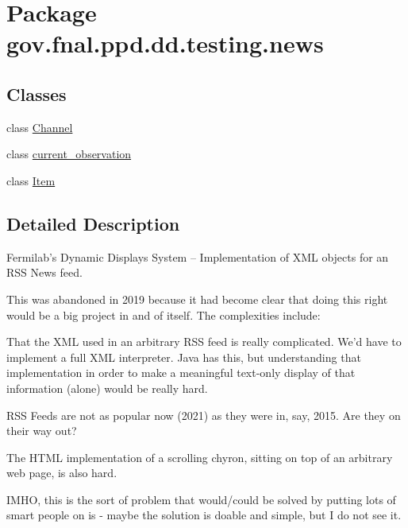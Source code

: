 \hypertarget{namespacegov_1_1fnal_1_1ppd_1_1dd_1_1testing_1_1news}{\section{Package gov.\-fnal.\-ppd.\-dd.\-testing.\-news}
\label{namespacegov_1_1fnal_1_1ppd_1_1dd_1_1testing_1_1news}
}
\subsection*{Classes}
\begin{DoxyCompactItemize}
\item 
class \hyperlink{classgov_1_1fnal_1_1ppd_1_1dd_1_1testing_1_1news_1_1Channel}{Channel}
\item 
class \hyperlink{classgov_1_1fnal_1_1ppd_1_1dd_1_1testing_1_1news_1_1current__observation}{current\-\_\-observation}
\item 
class \hyperlink{classgov_1_1fnal_1_1ppd_1_1dd_1_1testing_1_1news_1_1Item}{Item}
\end{DoxyCompactItemize}


\subsection{Detailed Description}
Fermilab's Dynamic Displays System -- Implementation of X\-M\-L objects for an R\-S\-S News feed. 

This was abandoned in 2019 because it had become clear that doing this right would be a big project in and of itself. The complexities include\-: 
\begin{DoxyItemize}
\item That the X\-M\-L used in an arbitrary R\-S\-S feed is really complicated. We'd have to implement a full X\-M\-L interpreter. Java has this, but understanding that implementation in order to make a meaningful text-\/only display of that information (alone) would be really hard. 
\item R\-S\-S Feeds are not as popular now (2021) as they were in, say, 2015. Are they on their way out? 
\item The H\-T\-M\-L implementation of a scrolling chyron, sitting on top of an arbitrary web page, is also hard. 
\end{DoxyItemize}

I\-M\-H\-O, this is the sort of problem that would/could be solved by putting lots of smart people on is -\/ maybe the solution is doable and simple, but I do not see it. 